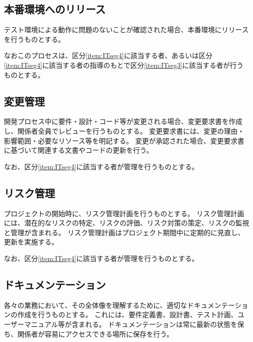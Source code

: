 \subsection{本番環境へのリリース}
テスト環境による動作に問題のないことが確認された場合、本番環境にリリースを行うものとする。

なおこのプロセスは、区分\ref{item:ITseg4}\hx に該当する者、あるいは区分\ref{item:ITseg4}\hx に該当する者の指導のもとで区分\ref{item:ITseg3}\hx に該当する者が行うものとする。

\subsection{変更管理}
開発プロセス中に要件・設計・コード等が変更される場合、変更要求書を作成し、関係者全員でレビューを行うものとする。
変更要求書には、変更の理由・影響範囲・必要なリソース等を明記する。
変更が承認された場合、変更要求書に基づいて関連する文書やコードの更新を行う。

なお、区分\ref{item:ITseg4}\hx に該当する者が管理を行うものとする。

\subsection{リスク管理}
プロジェクトの開始時に、リスク管理計画を行うものとする。
リスク管理計画には、潜在的なリスクの特定、リスクの評価、リスク対策の策定、リスクの監視と管理が含まれる。
リスク管理計画はプロジェクト期間中に定期的に見直し、更新を実施する。

なお、区分\ref{item:ITseg4}\hx に該当する者が管理を行うものとする。

\subsection{ドキュメンテーション}
各々の業務において、その全体像を理解するために、適切なドキュメンテーションの作成を行うものとする。
これには、要件定義書、設計書、テスト計画、ユーザーマニュアル等が含まれる。
ドキュメンテーションは常に最新の状態を保ち、関係者が容易にアクセスできる場所に保存を行う。

